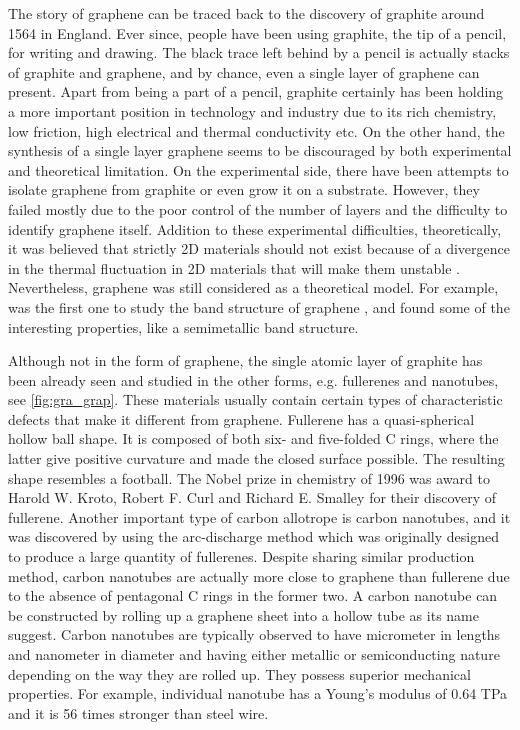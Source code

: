 The story of graphene can be traced back to the discovery of graphite around 1564 in England\cite{petroski1990pencil}. Ever since, people have been using graphite, the tip of a pencil, for writing and drawing. The black trace left behind by a pencil is actually stacks of graphite and graphene, and by chance, even a single layer of graphene can present.  Apart from being a part of a pencil, graphite certainly has been holding a more important position in technology and industry due to its rich chemistry, low friction, high electrical and thermal conductivity etc. On the other hand, the synthesis of a single layer graphene seems to be discouraged by both experimental and theoretical limitation. On the experimental side, there have been attempts\cite{Krishnan1997,Ohashi1997,Dresselhaus2002,Shioyama2001} to isolate graphene from graphite or even grow it on a substrate. However, they failed mostly due to the poor control of the number of layers and the difficulty to identify graphene itself.  Addition to these experimental difficulties, theoretically, it was believed that strictly 2D materials should not exist because of a divergence in the thermal fluctuation in 2D materials that will make them unstable \cite{Peierls1935,Landau1937,Mermin1968}. Nevertheless, graphene was still considered as a theoretical model. For example, \citet{Wallace1947} was the first one to study the band structure of graphene \cite{CastroNeto2009}, and found some of the interesting properties, like a semimetallic band structure. 

Although not in the form of graphene, the single atomic layer of graphite has been already seen and studied in the other forms, e.g. fullerenes and nanotubes, see \autoref{fig:gra_grap}. These materials usually contain certain types of characteristic defects that make it different from graphene.  Fullerene has a quasi-spherical hollow ball shape. It is composed of both six- and five-folded C rings, where the latter give positive curvature and made the closed surface possible. The resulting shape resembles a football\cite{Kroto1985,Lamb1990}. The Nobel prize in chemistry of 1996 was award to Harold W. Kroto, Robert F. Curl and Richard E. Smalley for their discovery of fullerene. Another important type of carbon allotrope is carbon nanotubes\cite{Iijima1993}, and it was discovered by using the arc-discharge method\cite{Lamb1990} which was originally designed to produce a large quantity of fullerenes. Despite sharing similar production method, carbon nanotubes are actually more close to graphene than fullerene due to the absence of pentagonal C rings in the former two. A carbon nanotube can be constructed by rolling up a graphene sheet into a hollow tube as its name suggest. Carbon nanotubes are typically observed to have micrometer in lengths and nanometer in diameter and having either metallic or semiconducting nature depending on the way they are rolled up. They possess superior mechanical properties. For example, individual nanotube has a Young's modulus of 0.64 TPa and it is 56 times stronger than steel wire\cite{Baughman787}.

